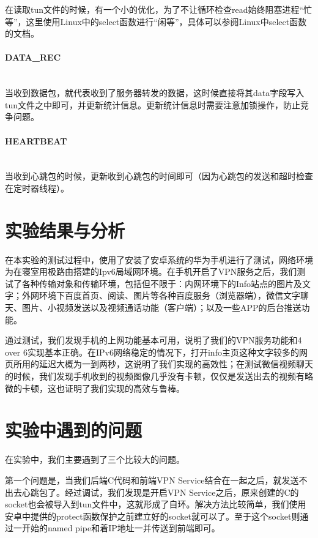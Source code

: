 \documentclass[paper=a4, fontsize=11pt, UTF8]{article} %
\numberwithin{equation}{section} %
\numberwithin{figure}{section} %
\numberwithin{table}{section} %
\begin{document}
在读取tun文件的时候，有一个小的优化，为了不让循环检查read始终阻塞进程“忙等”，这里使用Linux中的select函数进行“闲等”，具体可以参阅Linux中select函数的文档。

\paragraph{DATA\_REC} \mbox{}\\
当收到数据包，就代表收到了服务器转发的数据，这时候直接将其data字段写入tun文件之中即可，并更新统计信息。更新统计信息时需要注意加锁操作，防止竞争问题。

\paragraph{HEARTBEAT} \mbox{}\\
当收到心跳包的时候，更新收到心跳包的时间即可（因为心跳包的发送和超时检查在定时器线程）。


\section{实验结果与分析}

在本实验的测试过程中，使用了安装了安卓系统的华为手机进行了测试，网络环境为在寝室用极路由搭建的Ipv6局域网环境。在手机开启了VPN服务之后，我们测试了各种传输对象和传输环境，包括但不限于：内网环境下的Info站点的图片及文字；外网环境下百度首页、阅读、图片等各种百度服务（浏览器端），微信文字聊天、图片、小视频发送以及视频通话功能（客户端）；以及一些APP的后台推送功能。

通过测试，我们发现手机的上网功能基本可用，说明了我们的VPN服务功能和4 over 6实现基本正确。在IPv6网络稳定的情况下，打开info主页这种文字较多的网页所用的延迟大概为一到两秒，这说明了我们实现的高效性；在测试微信视频聊天的时候，我们发现手机收到的视频图像几乎没有卡顿，仅仅是发送出去的视频有略微的卡顿，这也证明了我们实现的高效与鲁棒。

\newpage
\section{实验中遇到的问题}

在实验中，我们主要遇到了三个比较大的问题。

第一个问题是，当我们后端C代码和前端VPN Service结合在一起之后，就发送不出去心跳包了。经过调试，我们发现是开启VPN Service之后，原来创建的C的socket也会被导入到tun文件中，这就形成了自环。解决方法比较简单，我们使用安卓中提供的protect函数保护之前建立好的socket就可以了。至于这个socket则通过一开始的named pipe和着IP地址一并传送到前端即可。
\end{document}

